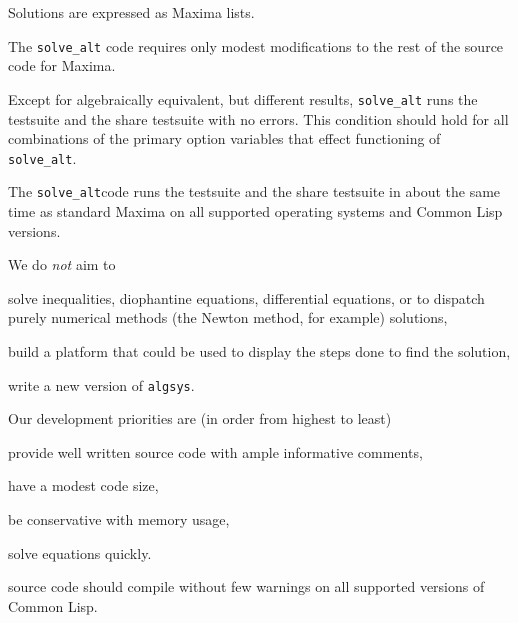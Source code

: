 \documentclass[]{scrartcl}
\newcommand{\altsolve}{\texttt{solve\_alt}}
\newcommand{\algsys}{\texttt{algsys}}
\begin{document}
\begin{alphalist}[noitemsep]

\item  Solutions are expressed as Maxima lists.

 \item The \altsolve\/ code requires only modest modifications to the rest of the source code for  Maxima.

\item Except for algebraically equivalent, but different results, \altsolve\/  runs the testsuite and the share testsuite with no errors. This condition should hold for all combinations of the primary option variables that effect functioning of \altsolve.

\item  The \altsolve code runs the testsuite and the share testsuite in about the same time as standard Maxima on all supported operating systems and Common Lisp versions.

\end{alphalist}
We do \emph{not} aim to
\begin{alphalist}[noitemsep]

\item solve inequalities, diophantine equations, differential equations, or to dispatch purely numerical methods (the Newton method, for example) solutions,

\item build a platform that could be used to display the steps done to find the solution,

\item write a new version of \algsys.

\end{alphalist}
Our development priorities are (in order from highest to least)

\begin{alphalist}[noitemsep]

\item  provide well written source code with ample informative comments,

\item  have  a modest code size,

\item be conservative with memory usage,

\item solve equations quickly.

\item source code should compile without few warnings on all supported versions of Common Lisp.
\end{alphalist}
\end{document}

